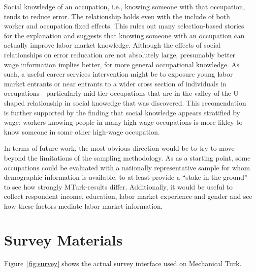 \documentclass[11pt]{article}
\begin{document}
Social knowledge of an occupation, i.e., knowing someone with that occupation, tends to reduce error.
The relationship holds even with the include of both worker and occupation fixed effects. 
This rules out many selection-based stories for the explanation and suggests that knowing someone with an occupation can actually improve labor market knowledge. 
Although the effects of social relationships on error reducation are not absolutely large, presumably better wage information implies better, for more general occupational knowledge.  
As such, a useful career services intervention might be to exposure young labor market entrants or near entrants to a wider cross section of individuals in occupations---particularly mid-tier occupations that are in the valley of the U-shaped relationship in social knowedge that was discovered. 
This recomendation is further supported by the finding that social knowledge appears stratified by wage: 
workers knowing people in many high-wage occupations is more likley to know someone in some other high-wage occupation. 

In terms of future work, the most obvious direction would be to try to move beyond the limitations of the sampling methodology. 
As as a starting point, some occupations could be evaluated with a nationally representative sample for whom demographic information is available, to at least provide a ``stake in the ground'' to see how strongly MTurk-results differ.
Additionally, it would be useful to collect respondent income, education, labor market experience and gender and see how these factors mediate labor market information. 




\newpage 

\appendix 

\section{Survey Materials} 
Figure~\ref{fig:survey} shows the actual survey interface used on Mechanical Turk. 
\end{document}
